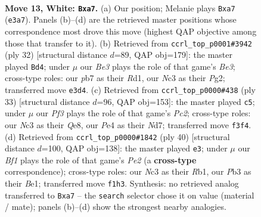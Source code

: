 \documentclass[11pt]{article}
\begin{document}
\clearpage

\begin{figure}[p]\centering
\begin{subfigure}{0.46\textwidth}\centering
\resizebox{\linewidth}{!}{%
\newchessgame
\chessboard[
  setfen={2kr3r/ppp1bppp/2bpqn2/8/4P1P1/1PNQBP2/P1P4P/2KR1B1R w - - 1 13},
  showmover=false,
  pgfstyle=straightmove, color=movearrow, markmove={e3-a7}
]}
\caption{}
\end{subfigure}\hfill
\begin{subfigure}{0.46\textwidth}\centering
\resizebox{\linewidth}{!}{%
\newchessgame
\chessboard[
  setfen={r3rbk1/5ppp/p1ppqn2/1p6/4P3/1PN1BP1P/P1PQ2P1/3RR1K1 w - - 0 17},
  showmover=false,
  pgfstyle=straightmove, color=movearrow, markmove={e3-d4}
]}
\caption{}
\end{subfigure}
\\[4pt]
\begin{subfigure}{0.46\textwidth}\centering
\resizebox{\linewidth}{!}{%
\newchessgame
\chessboard[
  setfen={r3qrk1/pbpn2pp/1p3b2/4pp2/1PP4P/2B1QNP1/P3PPB1/3R1RK1 b - - 0 17},
  showmover=false,
  pgfstyle=straightmove, color=movearrow, markmove={c7-c5}
]}
\caption{}
\end{subfigure}\hfill
\begin{subfigure}{0.46\textwidth}\centering
\resizebox{\linewidth}{!}{%
\newchessgame
\chessboard[
  setfen={2rr2k1/pp2ppbp/1qp1b1p1/n7/P2PB3/1P4P1/4PPNP/1R1QBRK1 w - - 3 21},
  showmover=false,
  pgfstyle=straightmove, color=movearrow, markmove={e2-e3}
]}
\caption{}
\end{subfigure}
\caption{\textbf{Move 13, White: \texttt{Bxa7}.} (a) Our position; Melanie plays \texttt{Bxa7} (\texttt{e3a7}). Panels (b)--(d) are the retrieved master positions whose correspondence most drove this move (highest QAP objective among those that transfer to it). (b) Retrieved from \texttt{ccrl\_top\_p0001\#3942} (ply 32) [structural distance $d$=89, QAP obj=179]: the master played \texttt{Bd4}; under $\mu$ our \emph{Be3} plays the role of that game's \emph{Be3}; cross-type roles: our \emph{p}b7 as their \emph{R}d1, our \emph{N}c3 as their \emph{P}g2; transferred move \texttt{e3d4}. (c) Retrieved from \texttt{ccrl\_top\_p0000\#438} (ply 33) [structural distance $d$=96, QAP obj=153]: the master played \texttt{c5}; under $\mu$ our \emph{Pf3} plays the role of that game's \emph{Pc2}; cross-type roles: our \emph{N}c3 as their \emph{Q}e8, our \emph{P}e4 as their \emph{N}d7; transferred move \texttt{f3f4}. (d) Retrieved from \texttt{ccrl\_top\_p0000\#1842} (ply 40) [structural distance $d$=100, QAP obj=138]: the master played \texttt{e3}; under $\mu$ our \emph{Bf1} plays the role of that game's \emph{Pe2} (a \textbf{cross-type} correspondence); cross-type roles: our \emph{N}c3 as their \emph{R}b1, our \emph{P}b3 as their \emph{B}e1; transferred move \texttt{f1h3}. Synthesis: no retrieved analog transferred to \texttt{Bxa7} -- the \texttt{search} selector chose it on value (material / mate); panels (b)--(d) show the strongest nearby analogies.}
\label{fig:thought-m24}
\end{figure}
\end{document}
